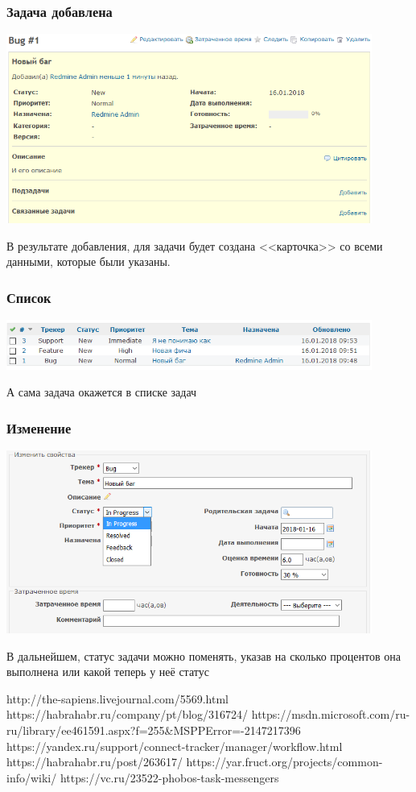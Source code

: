 \documentclass{../industrial-development}
\begin{document}
\begin{frame} \frametitle{Задача добавлена}
\centerline{\includegraphics[width=0.9\textwidth]{status.png}}
\end{frame}
\lecturenotes
В результате добавления, для задачи будет создана <<карточка>> со всеми данными, которые были указаны.

\begin{frame} \frametitle{Список}
\centerline{\includegraphics[width=0.9\textwidth]{list.png}}
\end{frame}
\lecturenotes
А сама задача окажется в списке задач

\begin{frame} \frametitle{Изменение}
\centerline{\includegraphics[width=0.9\textwidth]{changing.png}}
\end{frame}
\lecturenotes
В дальнейшем, статус задачи можно поменять, указав на сколько процентов она выполнена или какой теперь у неё статус

\begin{thebibliography}{99}
http://the-sapiens.livejournal.com/5569.html
https://habrahabr.ru/company/pt/blog/316724/
https://msdn.microsoft.com/ru-ru/library/ee461591.aspx?f=255&MSPPError=-2147217396
https://yandex.ru/support/connect-tracker/manager/workflow.html
https://habrahabr.ru/post/263617/
https://yar.fruct.org/projects/common-info/wiki/%
https://vc.ru/23522-phobos-task-messengers
\end{thebibliography}
\end{document}
